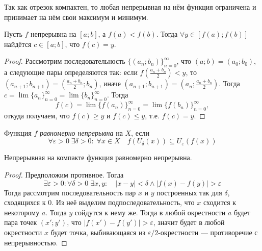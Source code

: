 \documentclass[12pt,a4paper]{article}
\begin{document}
    \begin{corollary}
        Так как отрезок компактен, то любая непрерывная на нём функция ограничена и принимает на нём свои максимум и минимум.
    \end{corollary}

    \begin{theorem}
        Пусть $f$ непрерывна на $[a; b]$, а $f(a) < f(b)$. Тогда $\forall y \in [f(a); f(b)]$ найдётся $c \in [a; b]$, что $f(c) = y$.
    \end{theorem}

    \begin{proof}
        Рассмотрим последовательность $\{(a_n; b_n)\}_{n=0}^\infty$, что $(a; b) = (a_0; b_0)$, а следующие пары определяются так: если $f(\frac{a_n+b_n}{2}) < y$, то $(a_{n+1}; b_{n+1}) = (\frac{a_n+b_n}{2}; b_n)$, иначе $(a_{n+1}; b_{n+1}) = (a_n; \frac{a_n+b_n}{2})$. Тогда $c = \lim \{a_n\}_{n=0}^\infty = \lim \{b_n\}_{n=0}^\infty$. Тогда
        \[f(c) = \lim \{f(a_n)\}_{n=0}^\infty = \lim \{f(b_n)\}_{n=0}^\infty,\]
        откуда получаем, что $f(c) \geqslant y$ и $f(c) \leqslant y$, т.е. $f(c) = y$.
    \end{proof}

    \begin{definition}
        Функция $f$ \emph{равномерно непрерывна} на $X$, если
        \[\forall \varepsilon > 0\; \exists \delta > 0:\; \forall x \in X\quad f(U_\delta(x)) \subseteq U_\varepsilon(f(x))\]
    \end{definition}

    \begin{theorem}[Кантор]
        Непрерывная на компакте функция равномерно непрерывна.
    \end{theorem}

    \begin{proof}
        Предположим противное. Тогда
        \[\exists \varepsilon > 0: \forall \delta > 0\; \exists x, y:\quad |x - y| < \delta \wedge |f(x) - f(y)| > \varepsilon\]
        Тогда рассмотрим последовательность пар $x$ и $y$ построенных так для $\delta$, сходящихся к $0$. Из неё выделим подпоследовательность, что $x$ сходится к некоторому $a$. Тогда $y$ сойдутся к нему же. Тогда в любой окрестности $a$ будет пара точек $(x'; y')$, что $|f(x') - f(y')| > \varepsilon$, значит будет в любой окрестности $x$ будет точка, выбивающаяся из $\varepsilon/2$-окрестности --- противоречие с непрерывностью.
    \end{proof}
\end{document}
